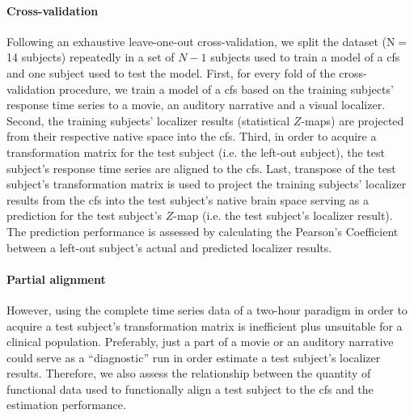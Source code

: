 \paragraph{Cross-validation}





%
Following an exhaustive leave-one-out cross-validation, we split the dataset
(N$=$14 subjects) repeatedly in a set of $N-1$ subjects used to train a model of
a \ac{cfs} and one subject used to test the model.
%
First, for every fold of the cross-validation procedure, we train a model of a
\ac{cfs} based on the training subjects' response time series to a movie, an
auditory narrative and a visual localizer.
%
Second, the training subjects' localizer results (statistical $Z$-maps) are
projected from their respective native space into the \ac{cfs}.
%
Third, in order to acquire a transformation matrix for the test subject (i.e.
the left-out subject), the test subject's response time series are aligned to
the \ac{cfs}.
%
Last, transpose of the test subject's transformation matrix is used to project
the training subjects' localizer results from the \ac{cfs} into the test
subject's native brain space serving as a prediction for the test subject's
$Z$-map (i.e.  the test subject's localizer result).
%
The prediction performance is assessed by calculating the Pearson's Coefficient
between a left-out subject's actual and predicted localizer results.


\paragraph{Partial alignment}
However, using the complete time series data of a two-hour paradigm in order to
acquire a test subject's transformation matrix is inefficient plus unsuitable
for a clinical population.
%
Preferably, just a part of a movie or an auditory narrative could serve as a
``diagnostic'' run in order estimate a test subject's localizer results.
%
Therefore, we also assess the relationship between the quantity of functional
data used to functionally align a test subject to the \ac{cfs} and the
estimation performance.


